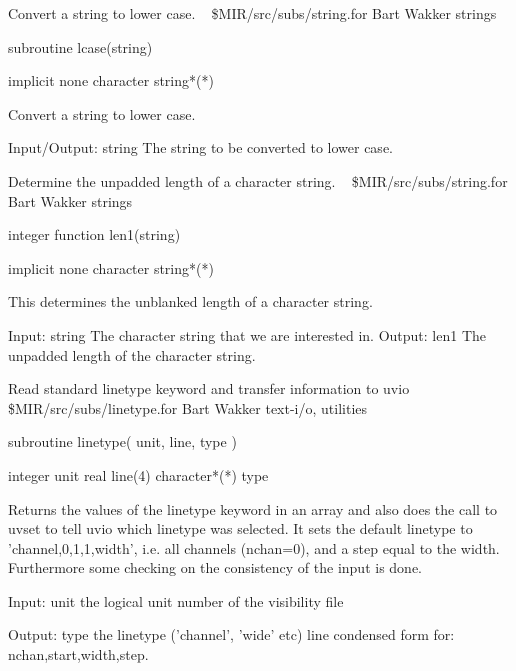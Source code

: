 %
\noindent Convert a string to lower case.
\newline \ 
\newline {} \$MIR/src/subs/string.for
\newline {} Bart Wakker
\newline {} strings
\par{\tenpoint
{\eightpoint\begintt
        subroutine lcase(string)

        implicit none
        character string*(*)

  Convert a string to lower case.

  Input/Output:
    string     The string to be converted to lower case.
\endtt}
\par}
%
\noindent Determine the unpadded length of a character string.
\newline \ 
\newline {} \$MIR/src/subs/string.for
\newline {} Bart Wakker
\newline \abox{Keywords:} strings
\par{\tenpoint
{\eightpoint\begintt
        integer function len1(string)

        implicit none
        character string*(*)

  This determines the unblanked length of a character string.

  Input:
    string     The character string that we are interested in.
  Output:
    len1       The unpadded length of the character string.
\endtt}
\par}
%
\noindent Read standard linetype keyword and transfer information to uvio
\newline \ 
\newline {} \$MIR/src/subs/linetype.for
\newline \abox{Responsible:} Bart Wakker
\newline {} text-i/o, utilities
\par{\tenpoint
{\eightpoint\begintt
      subroutine linetype( unit, line, type )

      integer       unit
      real          line(4)
      character*(*) type

 Returns the values of the linetype keyword in an array and also
 does the call to uvset to tell uvio which linetype was selected.
 It sets the default linetype to 'channel,0,1,1,width', i.e. all
 channels (nchan=0), and a step equal to the width.
 Furthermore some checking on the consistency of the input is done.

 Input:
    unit        the logical unit number of the visibility file

 Output:
    type        the linetype ('channel', 'wide' etc)
    line        condensed form for: nchan,start,width,step.
\endtt}
\par}
